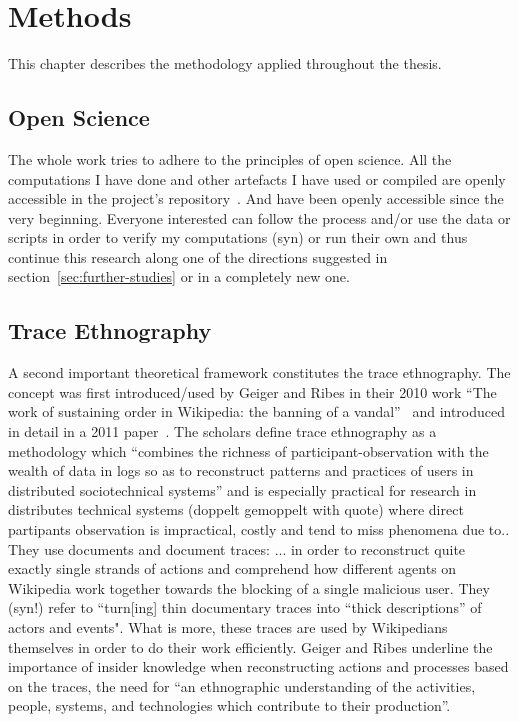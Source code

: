\chapter{Methods}
\label{chap:methods}

This chapter describes the methodology applied throughout the thesis.

\section{Open Science}

The whole work tries to adhere to the principles of open science. %
All the computations I have done and other artefacts I have used or compiled are openly accessible in the project's repository~\cite{github}.
And have been openly accessible since the very beginning.
Everyone interested can follow the process and/or use the data or scripts in order to verify my computations (syn) or run their own and thus continue this research along one of the directions suggested in section~\ref{sec:further-studies} or in a completely new one.

\section{Trace Ethnography}

A second important theoretical framework constitutes the trace ethnography.
The concept was first introduced/used by Geiger and Ribes in their 2010 work ``The work of sustaining order in Wikipedia: the banning of a vandal''~\cite{GeiRib2010} and introduced in detail in a 2011 paper~\cite{GeiRib2011}.
The scholars define trace ethnography as a methodology which
``combines the richness of participant-observation
with the wealth of data in logs so as to reconstruct
patterns and practices of users in distributed
sociotechnical systems''
and is especially practical for research in distributes technical systems (doppelt gemoppelt with quote) where direct partipants observation is impractical, costly and tend to miss phenomena due to..
They use documents and document traces: ... %
in order to reconstruct quite exactly single strands of actions and comprehend how different agents on Wikipedia work together towards the blocking of a single malicious user.
They (syn!) refer to ``turn[ing] thin documentary traces into “thick descriptions” of actors and events".
What is more, these traces are used by Wikipedians themselves in order to do their work efficiently.
Geiger and Ribes underline the importance of insider knowledge when reconstructing actions and processes based on the traces,
the need for ``an ethnographic understanding of the activities, people, systems, and technologies which contribute to their production''.

